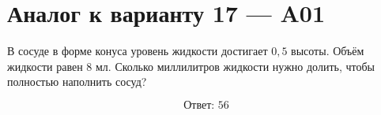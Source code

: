 \documentclass[12pt,a4paper]{article}
\begin{document}
\section*{Аналог к варианту 17 — A01}

В сосуде в форме конуса уровень жидкости достигает \(0{,}5\) высоты. Объём жидкости равен \(8\) мл. Сколько миллилитров жидкости нужно долить, чтобы полностью наполнить сосуд?

\begin{center}
\end{center}

\[
\boxed{\text{Ответ: }56}
\]
\end{document}

